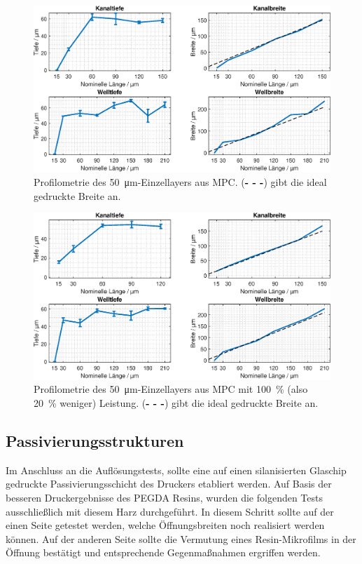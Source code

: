 \begin{figure}[!h]
    \centering
    \includegraphics[width=\linewidth]{plot/50um_SL_ResolutionV1.eps}
    \caption{Profilometrie des \SI{50}{\micro\meter}-Einzellayers aus MPC. (\textcolor{black}{\textbf{- - -}}) gibt die ideal gedruckte Breite an.}
    \label{fig:MPC_50um}
\end{figure}
\clearpage
\begin{figure}[!h]
    \centering
    \includegraphics[width=\linewidth]{plot/50um_100perc_SL_ResolutionV1.eps}
    \caption{Profilometrie des \SI{50}{\micro\meter}-Einzellayers aus MPC mit \SI{100}{\percent} (also \SI{20}{\percent} weniger) Leistung.  (\textcolor{black}{\textbf{- - -}}) gibt die ideal gedruckte Breite an.}
   \label{fig:MPC_50um_100perc}
\end{figure}

\subsection{Passivierungsstrukturen}

Im Anschluss an die Auflösungstests, sollte eine auf einen silanisierten Glaschip gedruckte Passivierungsschicht des Druckers etabliert werden. Auf Basis der besseren Druckergebnisse des PEGDA Resins, wurden die folgenden Tests ausschließlich mit diesem Harz durchgeführt. In diesem Schritt sollte auf der einen Seite getestet werden, welche Öffnungsbreiten noch realisiert werden können. Auf der anderen Seite sollte die Vermutung eines Resin-Mikrofilms in der Öffnung bestätigt und entsprechende Gegenmaßnahmen ergriffen werden.

